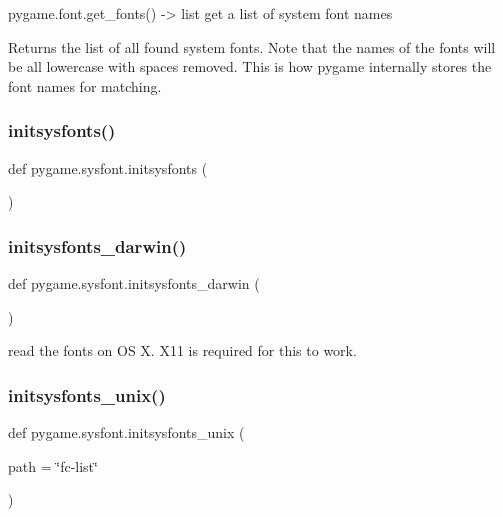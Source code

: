 \begin{DoxyVerb}pygame.font.get_fonts() -> list
   get a list of system font names

   Returns the list of all found system fonts. Note that
   the names of the fonts will be all lowercase with spaces
   removed. This is how pygame internally stores the font
   names for matching.
\end{DoxyVerb}
 \mbox{\label{namespacepygame_1_1sysfont_a768a000d8d77d24996fc02cad129f52a}} 
\subsubsection{\texorpdfstring{initsysfonts()}{initsysfonts()}}
{\footnotesize\ttfamily def pygame.\+sysfont.\+initsysfonts (\begin{DoxyParamCaption}{ }\end{DoxyParamCaption})}

\mbox{\label{namespacepygame_1_1sysfont_a43a2fb8cddbab24516864384310e224f}} 
\subsubsection{\texorpdfstring{initsysfonts\+\_\+darwin()}{initsysfonts\_darwin()}}
{\footnotesize\ttfamily def pygame.\+sysfont.\+initsysfonts\+\_\+darwin (\begin{DoxyParamCaption}{ }\end{DoxyParamCaption})}

\begin{DoxyVerb}read the fonts on OS X. X11 is required for this to work.\end{DoxyVerb}
 \mbox{\label{namespacepygame_1_1sysfont_a120c4d1f2af08bd76499963e735031e6}} 
\subsubsection{\texorpdfstring{initsysfonts\+\_\+unix()}{initsysfonts\_unix()}}
{\footnotesize\ttfamily def pygame.\+sysfont.\+initsysfonts\+\_\+unix (\begin{DoxyParamCaption}\item[{}]{path = {\ttfamily \char`\"{}fc-\/list\char`\"{}} }\end{DoxyParamCaption})}

